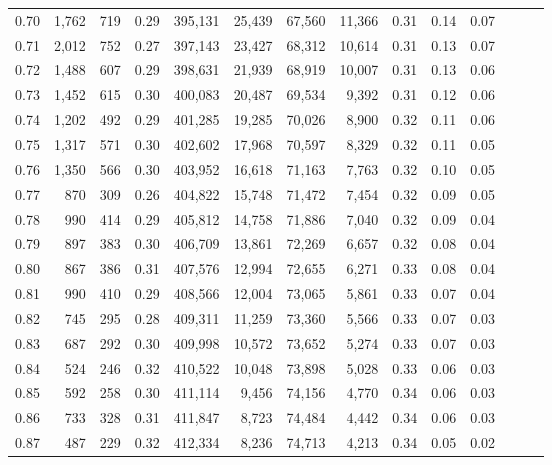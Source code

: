 \begin{tabular}{rrrrrrrrrrrrrr}
0.70 &   1,762 &    719 &  0.29 &  395,131 &   25,439 &  67,560 &  11,366 &  0.31 &  0.14 &      0.07 \\
0.71 &   2,012 &    752 &  0.27 &  397,143 &   23,427 &  68,312 &  10,614 &  0.31 &  0.13 &      0.07 \\
0.72 &   1,488 &    607 &  0.29 &  398,631 &   21,939 &  68,919 &  10,007 &  0.31 &  0.13 &      0.06 \\
0.73 &   1,452 &    615 &  0.30 &  400,083 &   20,487 &  69,534 &   9,392 &  0.31 &  0.12 &      0.06 \\
0.74 &   1,202 &    492 &  0.29 &  401,285 &   19,285 &  70,026 &   8,900 &  0.32 &  0.11 &      0.06 \\
0.75 &   1,317 &    571 &  0.30 &  402,602 &   17,968 &  70,597 &   8,329 &  0.32 &  0.11 &      0.05 \\
0.76 &   1,350 &    566 &  0.30 &  403,952 &   16,618 &  71,163 &   7,763 &  0.32 &  0.10 &      0.05 \\
0.77 &     870 &    309 &  0.26 &  404,822 &   15,748 &  71,472 &   7,454 &  0.32 &  0.09 &      0.05 \\
0.78 &     990 &    414 &  0.29 &  405,812 &   14,758 &  71,886 &   7,040 &  0.32 &  0.09 &      0.04 \\
0.79 &     897 &    383 &  0.30 &  406,709 &   13,861 &  72,269 &   6,657 &  0.32 &  0.08 &      0.04 \\
0.80 &     867 &    386 &  0.31 &  407,576 &   12,994 &  72,655 &   6,271 &  0.33 &  0.08 &      0.04 \\
0.81 &     990 &    410 &  0.29 &  408,566 &   12,004 &  73,065 &   5,861 &  0.33 &  0.07 &      0.04 \\
0.82 &     745 &    295 &  0.28 &  409,311 &   11,259 &  73,360 &   5,566 &  0.33 &  0.07 &      0.03 \\
0.83 &     687 &    292 &  0.30 &  409,998 &   10,572 &  73,652 &   5,274 &  0.33 &  0.07 &      0.03 \\
0.84 &     524 &    246 &  0.32 &  410,522 &   10,048 &  73,898 &   5,028 &  0.33 &  0.06 &      0.03 \\
0.85 &     592 &    258 &  0.30 &  411,114 &    9,456 &  74,156 &   4,770 &  0.34 &  0.06 &      0.03 \\
0.86 &     733 &    328 &  0.31 &  411,847 &    8,723 &  74,484 &   4,442 &  0.34 &  0.06 &      0.03 \\
0.87 &     487 &    229 &  0.32 &  412,334 &    8,236 &  74,713 &   4,213 &  0.34 &  0.05 &      0.02 \\

\end{tabular}
